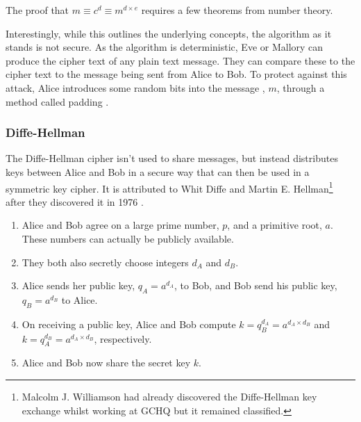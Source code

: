 The proof that $m \equiv c^d \equiv m^{d\times e}$ requires a few theorems from number theory. 

Interestingly, while this outlines the underlying concepts, the algorithm as it stands is not secure. As the algorithm is deterministic, Eve or Mallory can produce the cipher text of any plain text message. They can compare these to the cipher text to the message being sent from Alice to Bob. To protect against this attack, Alice introduces some random bits into the message , $m$, through a method called padding \cite{goldwasser1982probabilistic}. 



\subsubsection*{Diffe-Hellman}

The Diffe-Hellman cipher isn't used to share messages, but instead distributes keys between Alice and Bob in a secure way that can then be used in a symmetric key cipher. It is attributed to Whit Diffe and Martin E. Hellman\footnote{Malcolm J. Williamson had already discovered the Diffe-Hellman key exchange whilst working at GCHQ but it remained classified.} after they discovered it in 1976 \cite{}.

\begin{algorithm}
\begin{enumerate}
	\item Alice and Bob agree on a large prime number, $p$, and a primitive root, $a$. These numbers can actually be publicly available.
	\item They both also secretly choose integers $d_A$ and $d_B$.
	\item Alice sends her public key, $q_A = a^{d_A}$, to Bob, and Bob send his public key, $q_B = a^{d_B}$ to Alice.
	\item On receiving a public key, Alice and Bob compute $k = q_B^{d_A} = a^{d_A\times d_B}$ and $k = q_A^{d_B} = a^{d_A\times d_B}$, respectively.
	\item Alice and Bob now share the secret key $k$.
\end{enumerate}
\end{algorithm}

